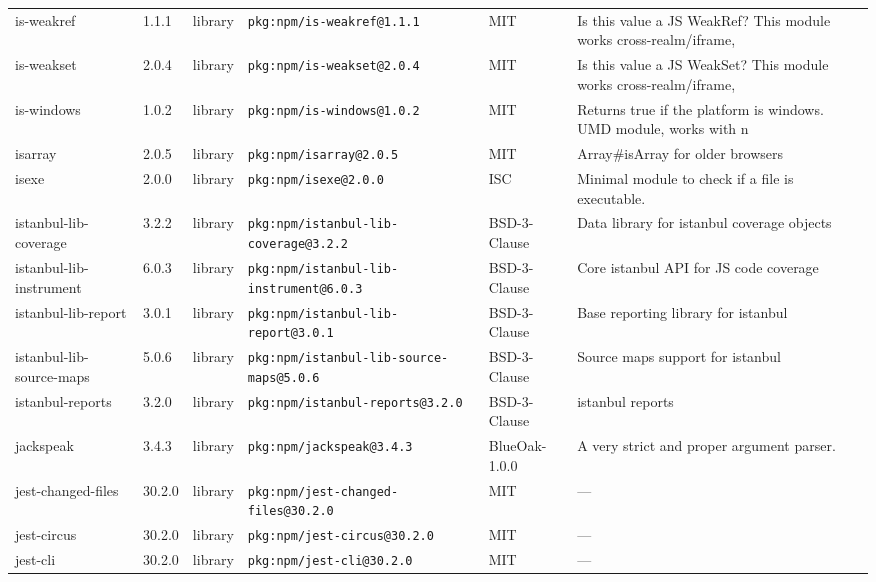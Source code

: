 \documentclass[11pt,a4paper]{article}
\begin{document}
\begin{longtable}{|p{4cm}|p{2cm}|p{1.6cm}|p{5cm}|p{1.5cm}|p{3.5cm}|}
\raggedright is-weakref & 1.1.1 & library & \small\texttt{pkg:npm/is-weakref@1.1.1} & MIT & \small Is this value a JS WeakRef? This module works cross-realm/iframe, \\
\raggedright is-weakset & 2.0.4 & library & \small\texttt{pkg:npm/is-weakset@2.0.4} & MIT & \small Is this value a JS WeakSet? This module works cross-realm/iframe, \\
\raggedright is-windows & 1.0.2 & library & \small\texttt{pkg:npm/is-windows@1.0.2} & MIT & \small Returns true if the platform is windows. UMD module, works with n \\
\raggedright isarray & 2.0.5 & library & \small\texttt{pkg:npm/isarray@2.0.5} & MIT & \small Array\#isArray for older browsers \\
\raggedright isexe & 2.0.0 & library & \small\texttt{pkg:npm/isexe@2.0.0} & ISC & \small Minimal module to check if a file is executable. \\
\raggedright istanbul-lib-coverage & 3.2.2 & library & \small\texttt{pkg:npm/istanbul-lib-coverage@3.2.2} & BSD-3-Clause & \small Data library for istanbul coverage objects \\
\raggedright istanbul-lib-instrument & 6.0.3 & library & \small\texttt{pkg:npm/istanbul-lib-instrument@6.0.3} & BSD-3-Clause & \small Core istanbul API for JS code coverage \\
\raggedright istanbul-lib-report & 3.0.1 & library & \small\texttt{pkg:npm/istanbul-lib-report@3.0.1} & BSD-3-Clause & \small Base reporting library for istanbul \\
\raggedright istanbul-lib-source-maps & 5.0.6 & library & \small\texttt{pkg:npm/istanbul-lib-source-maps@5.0.6} & BSD-3-Clause & \small Source maps support for istanbul \\
\raggedright istanbul-reports & 3.2.0 & library & \small\texttt{pkg:npm/istanbul-reports@3.2.0} & BSD-3-Clause & \small istanbul reports \\
\raggedright jackspeak & 3.4.3 & library & \small\texttt{pkg:npm/jackspeak@3.4.3} & BlueOak-1.0.0 & \small A very strict and proper argument parser. \\
\raggedright jest-changed-files & 30.2.0 & library & \small\texttt{pkg:npm/jest-changed-files@30.2.0} & MIT & \small — \\
\raggedright jest-circus & 30.2.0 & library & \small\texttt{pkg:npm/jest-circus@30.2.0} & MIT & \small — \\
\raggedright jest-cli & 30.2.0 & library & \small\texttt{pkg:npm/jest-cli@30.2.0} & MIT & \small — \\

\end{longtable}
\end{document}
